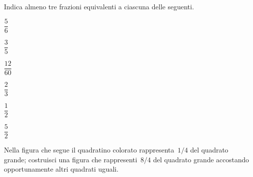 \begin{esercizio}
 \label{ese:3.7}
 Indica almeno tre frazioni equivalenti a ciascuna delle seguenti.
 \begin{multicols}{6}
 \begin{enumeratea}
 	\item $\dfrac{5}{6}$
 	\item $\dfrac{3}{5}$
 	\item $\dfrac{12}{60}$
 	\item $\dfrac{2}{3}$
 	\item $\dfrac{1}{2}$
 	\item $\dfrac{5}{2}$
 \end{enumeratea}
 \end{multicols}
\end{esercizio}

\begin{esercizio}
 \label{ese:3.8}
Nella figura che segue il quadratino colorato rappresenta~$1/4$ del quadrato 
grande; costruisci una figura che rappresenti~$8/4$ del quadrato grande 
accostando opportunamente altri quadrati uguali.
 \begin{center}
 
 \end{center}
\end{esercizio}

